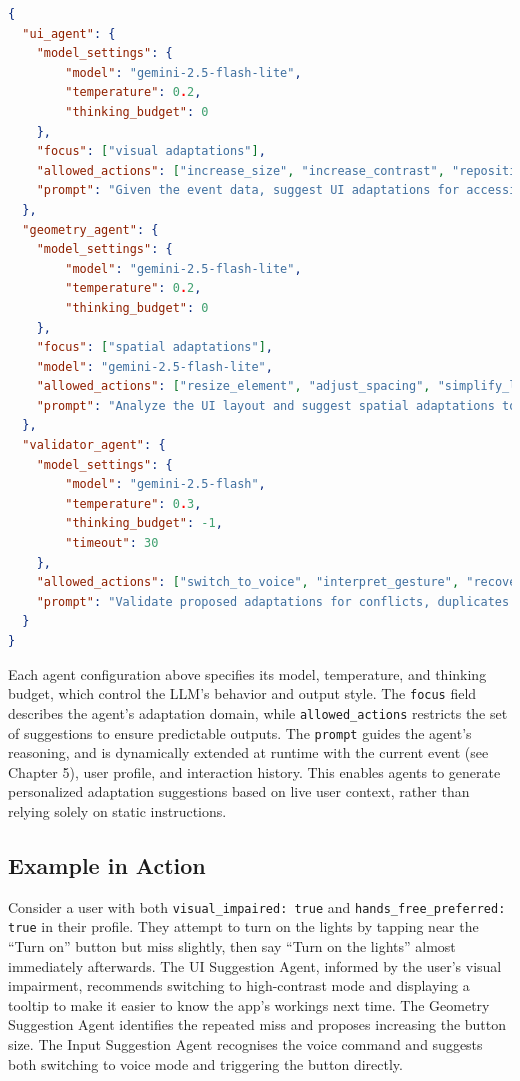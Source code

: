 \documentclass[openany]{book}
\begin{document}
\begin{lstlisting}[language=json,firstnumber=1, caption={Basic example of a 2-agent (+ validator) configuration}]
{
  "ui_agent": {
    "model_settings": {
        "model": "gemini-2.5-flash-lite",
        "temperature": 0.2,
        "thinking_budget": 0
    },
    "focus": ["visual adaptations"],
    "allowed_actions": ["increase_size", "increase_contrast", "reposition_element"],
    "prompt": "Given the event data, suggest UI adaptations for accessibility. Consider user profile and interaction history."
  },
  "geometry_agent": {
    "model_settings": {
        "model": "gemini-2.5-flash-lite",
        "temperature": 0.2,
        "thinking_budget": 0
    },
    "focus": ["spatial adaptations"],
    "model": "gemini-2.5-flash-lite",
    "allowed_actions": ["resize_element", "adjust_spacing", "simplify_layout"],
    "prompt": "Analyze the UI layout and suggest spatial adaptations to improve usability for motor-impaired users."
  },
  "validator_agent": {
    "model_settings": {
        "model": "gemini-2.5-flash",
        "temperature": 0.3,
        "thinking_budget": -1,
        "timeout": 30
    },
    "allowed_actions": ["switch_to_voice", "interpret_gesture", "recover_from_error", "increase_size", "increase_contrast", "reposition_element","resize_element", "adjust_spacing", "simplify_layout"],
    "prompt": "Validate proposed adaptations for conflicts, duplicates and inconsistencies based on user context, events and interaction history."
  }
}
\end{lstlisting}
Each agent configuration above specifies its model, temperature, and thinking budget, which control the LLM's behavior and output style. The \texttt{focus} field describes the agent's adaptation domain, while \texttt{allowed\_actions} restricts the set of suggestions to ensure predictable outputs. The \texttt{prompt} guides the agent's reasoning, and is dynamically extended at runtime with the current event (see Chapter 5), user profile, and interaction history. This enables agents to generate personalized adaptation suggestions based on live user context, rather than relying solely on static instructions.

\subsection{Example in Action}
Consider a user with both \texttt{visual\_impaired: true} and \texttt{hands\_free\_preferred: true} in their profile. They attempt to turn on the lights by tapping near the “Turn on” button but miss slightly, then say “Turn on the lights” almost immediately afterwards. The UI Suggestion Agent, informed by the user’s visual impairment, recommends switching to high-contrast mode and displaying a tooltip to make it easier to know the app's workings next time. The Geometry Suggestion Agent identifies the repeated miss and proposes increasing the button size. The Input Suggestion Agent recognises the voice command and suggests both switching to voice mode and triggering the button directly.
\end{document}
